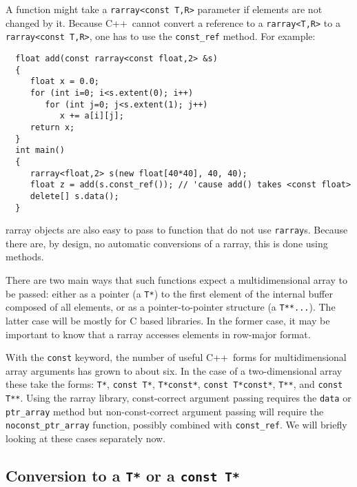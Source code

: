 \documentclass[12pt,twoside]{article}
\newcommand{\cxx}{C{++}}
\begin{document}
A function might take a \texttt{rarray{\tt<}const T,R{\tt>}} parameter if elements are not changed by it. Because \cxx\ cannot convert a reference to a \texttt{rarray{\tt<}T,R{\tt>}} to a \texttt{rarray{\tt<}const T,R{\tt>}}, one has to use the \texttt{const\_ref} method.
For example:
\vspace{-5pt}\begin{framed}\vspace{-14pt}%
\begin{verbatim}
  float add(const rarray<const float,2> &s) 
  {
     float x = 0.0;
     for (int i=0; i<s.extent(0); i++)
        for (int j=0; j<s.extent(1); j++)
           x += a[i][j];
     return x;
  }
  int main() 
  {
     rarray<float,2> s(new float[40*40], 40, 40);
     float z = add(s.const_ref()); // 'cause add() takes <const float>
     delete[] s.data();
  }
\end{verbatim}
\vspace{-14pt}
\end{framed}\vspace{-8pt}

rarray objects are also easy to pass to function that do not use \texttt{rarray}s. Because there are, by design, no automatic conversions of a
rarray, this is done using methods.

There are two main ways that such functions expect a multidimensional
array to be passed: either as a pointer (a \texttt{T*}) to the first
element of the internal buffer composed of all elements, or as a
pointer-to-pointer structure (a \texttt{T**...}).  The latter case
will be mostly for C based libraries.  In the former case, it may be
important to know that a rarray accesses elements in row-major
format.

With the \texttt{const} keyword, the number of useful \cxx\ forms for multidimensional array arguments has grown to about six.  In the case of a two-dimensional array these take the forms:
 \texttt{T*}, \texttt{const T*}, \texttt{T*const*}, \texttt{const T*const*}, \texttt{T**}, and \texttt{const T**}.
Using the rarray library, const-correct argument passing requires the \texttt{data} or \texttt{ptr\_array} method but non-const-correct argument passing will require the \texttt{noconst\_ptr\_array} function, possibly combined with \texttt{const\_ref}.
We will briefly looking at these cases separately now.

\subsection{Conversion to a {\tt T*} or a {\tt const T*}}
\end{document}
